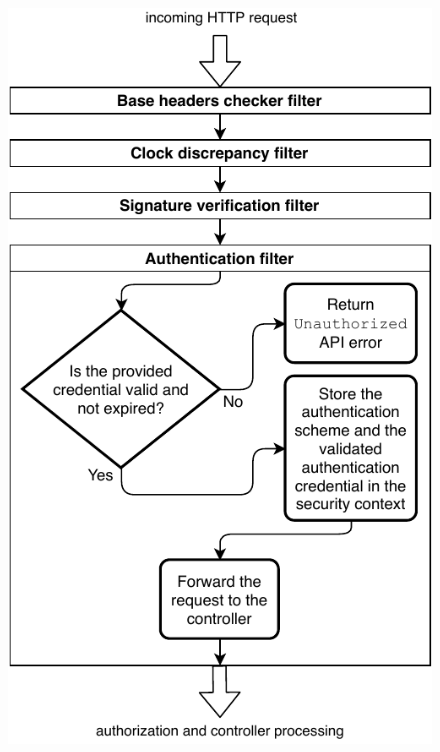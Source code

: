 \begin{figure}[!htb]
    \centering
    \includegraphics[height=\textheight-1cm]{figures/authentication-filter.pdf}
\end{figure}
